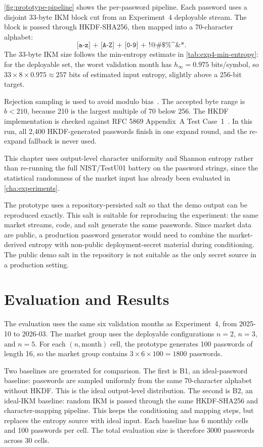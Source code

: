 \documentclass[11pt,titlepage,openany,oneside]{book}  %
\begin{document}
\cref{fig:prototype-pipeline} shows the per-password pipeline. Each password uses a disjoint 33-byte IKM block cut from an Experiment~4 deployable stream. The block is passed through HKDF-SHA256, then mapped into a 70-character alphabet:
\[
\texttt{[a-z] + [A-Z] + [0-9] + !@\#\$\%\textasciicircum\&*}.
\]
The 33-byte IKM size follows the min-entropy estimate in \cref{tab:exp4-min-entropy}: for the deployable set, the worst validation month has $h_\infty = 0.975$ bits/symbol, so $33 \times 8 \times 0.975 \approx 257$ bits of estimated input entropy, slightly above a 256-bit target.

Rejection sampling is used to avoid modulo bias~\citep{lemire2019random}. The accepted byte range is $b < 210$, because 210 is the largest multiple of 70 below 256. The HKDF implementation is checked against RFC 5869 Appendix~A Test Case~1~\citep{krawczyk2010rfc5869}. In this run, all 2,400 HKDF-generated passwords finish in one expand round, and the re-expand fallback is never used.

This chapter uses output-level character uniformity and Shannon entropy rather than re-running the full NIST/TestU01 battery on the password strings, since the statistical randomness of the market input has already been evaluated in \cref{cha:experiments}.

The prototype uses a repository-persisted salt so that the demo output can be reproduced exactly. This salt is suitable for reproducing the experiment: the same market streams, code, and salt generate the same passwords. Since market data are public, a production password generator would need to combine the market-derived entropy with non-public deployment-secret material during conditioning. The public demo salt in the repository is not suitable as the only secret source in a production setting.

\section{Evaluation and Results}
\label{sec:prototype-results}

The evaluation uses the same six validation months as Experiment~4, from 2025-10 to 2026-03. The market group uses the deployable configurations $n=2$, $n=3$, and $n=5$. For each $(n,\text{month})$ cell, the prototype generates 100 passwords of length 16, so the market group contains $3 \times 6 \times 100 = 1800$ passwords.

Two baselines are generated for comparison. The first is B1, an ideal-password baseline: passwords are sampled uniformly from the same 70-character alphabet without HKDF. This is the ideal output-level distribution. The second is B2, an ideal-IKM baseline: random IKM is passed through the same HKDF-SHA256 and character-mapping pipeline. This keeps the conditioning and mapping steps, but replaces the entropy source with ideal input. Each baseline has 6 monthly cells and 100 passwords per cell. The total evaluation size is therefore 3000 passwords across 30 cells.
\end{document}
